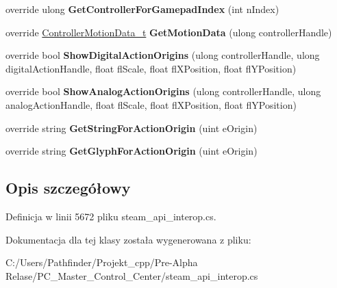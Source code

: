 \begin{DoxyCompactItemize}
\item 
\mbox{\label{class_valve_1_1_steamworks_1_1_c_steam_controller_a03fdffa1019cd9600c0d0f664cd29ea3}} 
override ulong {\bfseries Get\+Controller\+For\+Gamepad\+Index} (int n\+Index)
\item 
\mbox{\label{class_valve_1_1_steamworks_1_1_c_steam_controller_a2404fe6d9a9c44d1aca8c23b7ee4e2bc}} 
override \hyperlink{struct_valve_1_1_steamworks_1_1_controller_motion_data__t}{Controller\+Motion\+Data\+\_\+t} {\bfseries Get\+Motion\+Data} (ulong controller\+Handle)
\item 
\mbox{\label{class_valve_1_1_steamworks_1_1_c_steam_controller_a16af0ec66e6e6493c62a02e1f29acf73}} 
override bool {\bfseries Show\+Digital\+Action\+Origins} (ulong controller\+Handle, ulong digital\+Action\+Handle, float fl\+Scale, float fl\+X\+Position, float fl\+Y\+Position)
\item 
\mbox{\label{class_valve_1_1_steamworks_1_1_c_steam_controller_a18f6d0c3a065e87614204b9d9d5e6173}} 
override bool {\bfseries Show\+Analog\+Action\+Origins} (ulong controller\+Handle, ulong analog\+Action\+Handle, float fl\+Scale, float fl\+X\+Position, float fl\+Y\+Position)
\item 
\mbox{\label{class_valve_1_1_steamworks_1_1_c_steam_controller_a781fcc2f9aed5c3178370788ecb3517e}} 
override string {\bfseries Get\+String\+For\+Action\+Origin} (uint e\+Origin)
\item 
\mbox{\label{class_valve_1_1_steamworks_1_1_c_steam_controller_a13081388dfb6e167e3d09ff6063f28e4}} 
override string {\bfseries Get\+Glyph\+For\+Action\+Origin} (uint e\+Origin)
\end{DoxyCompactItemize}


\subsection{Opis szczegółowy}


Definicja w linii 5672 pliku steam\+\_\+api\+\_\+interop.\+cs.



Dokumentacja dla tej klasy została wygenerowana z pliku\+:\begin{DoxyCompactItemize}
\item 
C\+:/\+Users/\+Pathfinder/\+Projekt\+\_\+cpp/\+Pre-\/\+Alpha Relase/\+P\+C\+\_\+\+Master\+\_\+\+Control\+\_\+\+Center/steam\+\_\+api\+\_\+interop.\+cs\end{DoxyCompactItemize}
